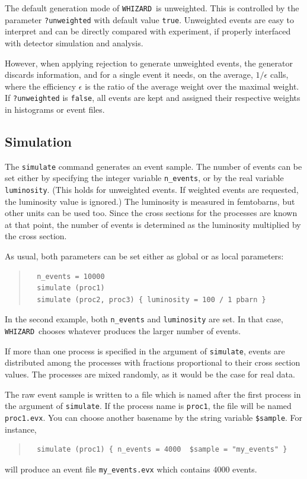 \documentclass[12pt]{book}
\newcommand{\ttt}[1]{\texttt{#1}}
\newcommand{\whizard}{\texttt{WHIZARD}}
\begin{document}
The default generation mode of \whizard\ is unweighted.  This is controlled by
the parameter \verb|?unweighted| with default value \ttt{true}.  Unweighted
events are easy to interpret and can be directly compared with experiment, if
properly interfaced with detector simulation and analysis.

However, when applying rejection to generate unweighted events, the generator
discards information, and for a single event it needs, on the average,
$1/\epsilon$ calls, where the efficiency $\epsilon$ is the ratio of the
average weight over the maximal weight.  If \verb|?unweighted| is \ttt{false},
all events are kept and assigned their respective weights in histograms or
event files.


\subsection{Simulation}
\label{sec:simulation}

The \ttt{simulate} command generates an event sample.  The number of events
can be set either by specifying the integer variable \verb|n_events|, or by
the real variable \verb|luminosity|.  (This holds for unweighted events.  If
weighted events are requested, the luminosity value is ignored.)  The
luminosity is measured in 
femtobarns, but other units can be used too.  Since the cross sections for the
processes are known at that point, the number of events is determined as the
luminosity multiplied by the cross section.

As usual, both parameters can be set either as global or as local parameters:
\begin{quote}
\begin{footnotesize}
\begin{verbatim}
  n_events = 10000
  simulate (proc1)
  simulate (proc2, proc3) { luminosity = 100 / 1 pbarn }
\end{verbatim}
\end{footnotesize}
\end{quote}
In the second example, both \verb|n_events| and \verb|luminosity| are set.  
In that case, \whizard\ chooses whatever produces the larger number of events.

If more than one process is specified in the argument of \ttt{simulate},
events are distributed among the processes with fractions proportional to
their cross section values.  The processes are mixed randomly, as it would be
the case for real data.

The raw event sample is written to a file which is named after the first process
in the argument of \ttt{simulate}.  If the process name is \ttt{proc1}, the
file will be named \ttt{proc1.evx}.  You can choose another basename by the
string variable \verb|$sample|.  For instance,
\begin{quote}
\begin{footnotesize}
\begin{verbatim}
  simulate (proc1) { n_events = 4000  $sample = "my_events" }
\end{verbatim}
\end{footnotesize}
\end{quote}
will produce an event file \verb|my_events.evx| which contains $4000$ events.
\end{document}
